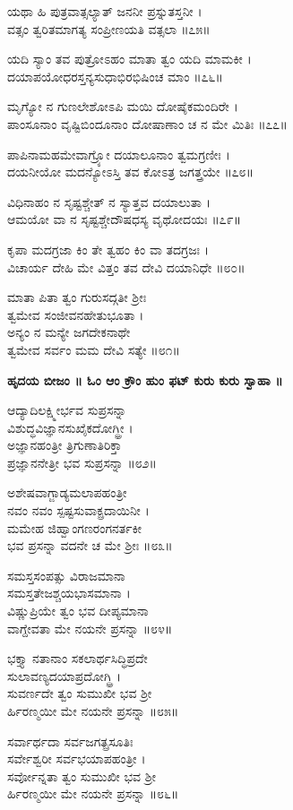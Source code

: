 	ಯಥಾ ಹಿ ಪುತ್ರವಾತ್ಸಲ್ಯಾತ್ ಜನನೀ ಪ್ರಸ್ನುತಸ್ತನೀ ।\\
	ವತ್ಸಂ ತ್ವರಿತಮಾಗತ್ಯ ಸಂಪ್ರೀಣಯತಿ ವತ್ಸಲಾ ॥೭೫॥

ಯದಿ ಸ್ಯಾಂ ತವ ಪುತ್ರೋಽಹಂ ಮಾತಾ ತ್ವಂ ಯದಿ ಮಾಮಕೀ ।\\
ದಯಾಪಯೋಧರಸ್ತನ್ಯಸುಧಾಭಿರಭಿಷಿಂಚ ಮಾಂ ॥೭೬॥

	ಮೃಗ್ಯೋ ನ ಗುಣಲೇಶೋಽಪಿ ಮಯಿ ದೋಷೈಕಮಂದಿರೇ ।\\
	ಪಾಂಸೂನಾಂ ವೃಷ್ಟಿಬಿಂದೂನಾಂ ದೋಷಾಣಾಂ ಚ ನ ಮೇ ಮಿತಿಃ ॥೭೭॥

ಪಾಪಿನಾಮಹಮೇವಾಗ್ರ್ಯೋ ದಯಾಲೂನಾಂ ತ್ವಮಗ್ರಣೀಃ ।\\
ದಯನೀಯೋ ಮದನ್ಯೋಽಸ್ತಿ ತವ ಕೋಽತ್ರ ಜಗತ್ತ್ರಯೇ ॥೭೮॥

	ವಿಧಿನಾಹಂ ನ ಸೃಷ್ಟಶ್ಚೇತ್ ನ ಸ್ಯಾತ್ತವ ದಯಾಲುತಾ ।\\
	ಆಮಯೋ ವಾ ನ ಸೃಷ್ಟಶ್ಚೇದೌಷಧಸ್ಯ ವೃಥೋದಯಃ ॥೭೯॥

ಕೃಪಾ ಮದಗ್ರಜಾ ಕಿಂ ತೇ ತ್ವಹಂ ಕಿಂ ವಾ ತದಗ್ರಜಃ ।\\
ವಿಚಾರ್ಯ ದೇಹಿ ಮೇ ವಿತ್ತಂ ತವ ದೇವಿ ದಯಾನಿಧೇ ॥೮೦॥

	ಮಾತಾ ಪಿತಾ ತ್ವಂ ಗುರುಸದ್ಗತೀ ಶ್ರೀಃ\\ತ್ವಮೇವ ಸಂಜೀವನಹೇತುಭೂತಾ ।\\
	ಅನ್ಯಂ ನ ಮನ್ಯೇ ಜಗದೇಕನಾಥೇ\\ ತ್ವಮೇವ ಸರ್ವಂ ಮಮ ದೇವಿ ಸತ್ಯೇ ॥೮೧॥

{\bfseries  ಹೃದಯ ಬೀಜಂ ॥ ಓಂ ಆಂ ಕ್ರೌಂ ಹುಂ ಫಟ್ ಕುರು ಕುರು ಸ್ವಾಹಾ ॥}

ಆದ್ಯಾದಿಲಕ್ಷ್ಮೀರ್ಭವ ಸುಪ್ರಸನ್ನಾ \\ವಿಶುದ್ಧವಿಜ್ಞಾನಸುಖೈಕದೋಗ್ಧ್ರೀ ।\\
ಅಜ್ಞಾನಹಂತ್ರೀ ತ್ರಿಗುಣಾತಿರಿಕ್ತಾ \\ಪ್ರಜ್ಞಾನನೇತ್ರೀ ಭವ ಸುಪ್ರಸನ್ನಾ ॥೮೨॥

	ಅಶೇಷವಾಗ್ಜಾಡ್ಯಮಲಾಪಹಂತ್ರೀ\\ ನವಂ ನವಂ ಸ್ಪಷ್ಟಸುವಾಕ್ಪ್ರದಾಯಿನೀ ।\\
	ಮಮೇಹ ಜಿಹ್ವಾಂಗಣರಂಗನರ್ತಕೀ\\ ಭವ ಪ್ರಸನ್ನಾ ವದನೇ ಚ ಮೇ ಶ್ರೀಃ ॥೮೩॥

ಸಮಸ್ತಸಂಪತ್ಸು ವಿರಾಜಮಾನಾ\\ ಸಮಸ್ತತೇಜಶ್ಚಯಭಾಸಮಾನಾ ।\\
ವಿಷ್ಣುಪ್ರಿಯೇ ತ್ವಂ ಭವ ದೀಪ್ಯಮಾನಾ\\ ವಾಗ್ದೇವತಾ ಮೇ ನಯನೇ ಪ್ರಸನ್ನಾ ॥೮೪॥

	ಭಕ್ತ್ಯಾ ನತಾನಾಂ ಸಕಲಾರ್ಥಸಿದ್ಧಿಪ್ರದೇ\\ ಸುಲಾವಣ್ಯದಯಾಪ್ರದೋಗ್ಧ್ರಿ ।\\
	ಸುವರ್ಣದೇ ತ್ವಂ ಸುಮುಖೀ ಭವ ಶ್ರೀ\\ರ್ಹಿರಣ್ಮಯೀ ಮೇ ನಯನೇ ಪ್ರಸನ್ನಾ ॥೮೫॥

ಸರ್ವಾರ್ಥದಾ ಸರ್ವಜಗತ್ಪ್ರಸೂತಿಃ \\ಸರ್ವೇಶ್ವರೀ ಸರ್ವಭಯಾಪಹಂತ್ರೀ ।\\
ಸರ್ವೋನ್ನತಾ ತ್ವಂ ಸುಮುಖೀ ಭವ ಶ್ರೀ\\ರ್ಹಿರಣ್ಮಯೀ ಮೇ ನಯನೇ ಪ್ರಸನ್ನಾ ॥೮೬॥

